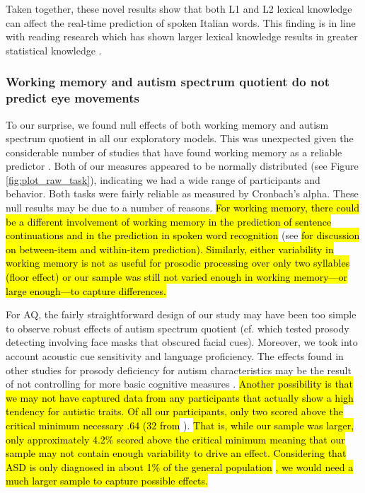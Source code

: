 Taken together, these novel results show that both L1 and L2 lexical knowledge can affect the real-time prediction of spoken Italian words. This finding is in line with reading research which has shown larger lexical knowledge results in greater statistical knowledge \citep{mirman2008attractor, kuperman2013reassessing}.


\subsubsection{Working memory and autism spectrum quotient do not predict eye movements}
To our surprise, we found null effects of both working memory and autism spectrum quotient in all our exploratory models. This was unexpected given the considerable number of studies that have found working memory as a reliable predictor \citep{Traxler2009, Huettig2016}. Both of our measures appeared to be normally distributed (see Figure \ref{fig:plot_raw_task}), indicating we had a wide range of participants and behavior. Both tasks were fairly reliable as measured by Cronbach's alpha. These null results may be due to a number of reasons. \hl{For working memory, there could be a different involvement of working memory in the prediction of sentence continuations and in the prediction in spoken word recognition} (see \cite{huettig2022parallel} \hl{for discussion on between-item and within-item prediction). Similarly, either variability in working memory is not as useful for prosodic processing over only two syllables (floor effect) or our sample was still not varied enough in working memory---or large enough---to capture differences.} 

For AQ, the fairly straightforward design of our study may have been too simple to observe robust effects of autism spectrum quotient (cf. \cite{Sinagra2022} which tested prosody detecting involving face masks that obscured facial cues). Moreover, we took into account acoustic cue sensitivity and language proficiency. The effects found in other studies for prosody deficiency for autism characteristics may be the result of not controlling for more basic cognitive measures \cite{grossman2023relationship}. \hl{Another possibility is that we may not have captured data from any participants that actually show a high tendency for autistic traits. Of all our participants, only two scored above the critical minimum necessary .64 (32 from }\cite{Baron-Cohen2001}).\hl{ That is, while our sample was larger, only approximately 4.2\% scored above the critical minimum meaning that our sample may not contain enough variability to drive an effect. Considering that ASD is only diagnosed in about 1\% of the general population} \citep{who2023autism}\hl{, we would need a much larger sample to capture possible effects.}



